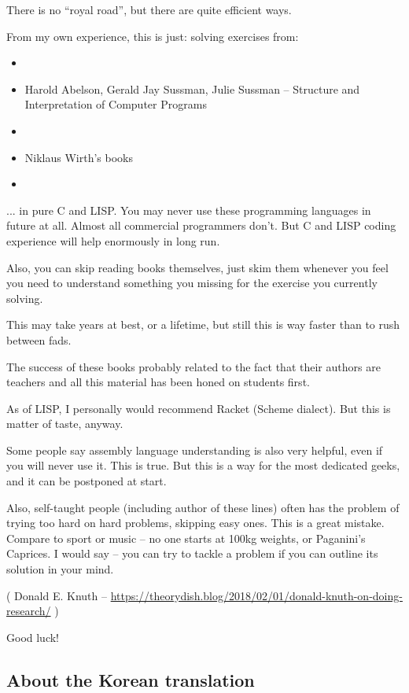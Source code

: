 There is no ``royal road'', but there are quite efficient ways.

From my own experience, this is just: solving exercises from:

\begin{itemize}
\item \KRBook
\item Harold Abelson, Gerald Jay Sussman, Julie Sussman -- Structure and Interpretation of Computer Programs
\item \TAOCP
\item Niklaus Wirth's books
\item \RobPikePractice
\end{itemize}

... in pure C and LISP.
You may never use these programming languages in future at all.
Almost all commercial programmers don’t. But C and LISP coding experience will help enormously in long run.

Also, you can skip reading books themselves,
just skim them whenever you feel you need to understand something you missing for the exercise you currently solving.

This may take years at best, or a lifetime, but still this is way faster than to rush between fads.

The success of these books probably related to the fact that their authors are teachers
and all this material has been honed on students first.

As of LISP, I personally would recommend Racket (Scheme dialect). But this is matter of taste, anyway.

Some people say assembly language understanding is also very helpful, even if you will never use it.
This is true.
But this is a way for the most dedicated geeks, and it can be postponed at start.

Also, self-taught people (including author of these lines) often has the problem of trying too hard on hard problems,
skipping easy ones.
This is a great mistake.
Compare to sport or music -- no one starts at 100kg weights, or Paganini's Caprices.
I would say -- you can try to tackle a problem if you can outline its solution in your mind.


( Donald E. Knuth -- \url{https://theorydish.blog/2018/02/01/donald-knuth-on-doing-research/} )

Good luck!

\subsection*{About the Korean translation}

